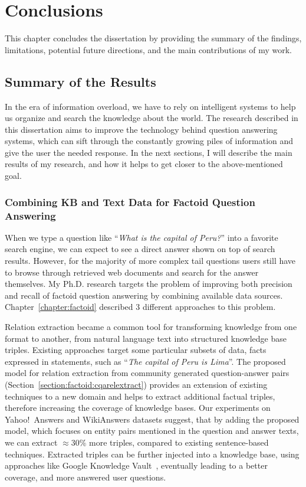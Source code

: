 \chapter{Conclusions}
\label{chapter:conclusion}

This chapter concludes the dissertation by providing the summary of the findings, limitations, potential future directions, and the main contributions of my work.

\section{Summary of the Results}
\label{section:conclusion:summary}

In the era of information overload, we have to rely on intelligent systems to help us organize and search the knowledge about the world.
The research described in this dissertation aims to improve the technology behind question answering systems, which can sift through the constantly growing piles of information and give the user the needed response.
In the next sections, I will describe the main results of my research, and how it helps to get closer to the above-mentioned goal.

\subsection{Combining KB and Text Data for Factoid Question Answering}
\label{section:conclusion:summary:factoid}

When we type a question like ``\textit{What is the capital of Peru?}'' into a favorite search engine, we can expect to see a direct answer shown on top of search results.
However, for the majority of more complex tail questions users still have to browse through retrieved web documents and search for the answer themselves.
My Ph.D. research targets the problem of improving both precision and recall of factoid question answering by combining available data sources.
Chapter~\ref{chapter:factoid} described 3 different approaches to this problem.

Relation extraction became a common tool for transforming knowledge from one format to another, \eg from natural language text into structured knowledge base triples.
Existing approaches target some particular subsets of data, \eg facts expressed in statements, such as ``\textit{The capital of Peru is Lima}''.
The proposed model for relation extraction from community generated question-answer pairs (Section~\ref{section:factoid:cqarelextract}) provides an extension of existing techniques to a new domain and helps to extract additional factual triples, therefore increasing the coverage of knowledge bases.
Our experiments on Yahoo!~Answers and WikiAnswers datasets suggest, that by adding the proposed model, which focuses on entity pairs mentioned in the question and answer texts, we can extract $\approx 30\%$ more triples, compared to existing sentence-based techniques.
Extracted triples can be further injected into a knowledge base, \eg using approaches like Google Knowledge Vault~\cite{Dong:2014:KVW:2623330.2623623}, eventually leading to a better coverage, and more answered user questions.

